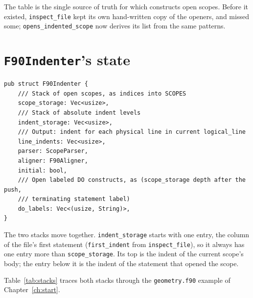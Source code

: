 \documentclass[11pt,a4paper,openany]{book}
\newcommand{\code}[1]{\texttt{\small #1}}
\newcommand{\file}[1]{\texttt{\small\color{accent}#1}}
\begin{document}
The table is the single source of truth for which constructs open scopes.
Before it existed, \code{inspect\_file} kept its own hand-written copy of the
openers, and missed some; \code{opens\_indented\_scope} now derives its list
from the same patterns.

\section{\texttt{F90Indenter}'s state}

\begin{lstlisting}[style=rust]
pub struct F90Indenter {
    /// Stack of open scopes, as indices into SCOPES
    scope_storage: Vec<usize>,
    /// Stack of absolute indent levels
    indent_storage: Vec<usize>,
    /// Output: indent for each physical line in current logical_line
    line_indents: Vec<usize>,
    parser: ScopeParser,
    aligner: F90Aligner,
    initial: bool,
    /// Open labeled DO constructs, as (scope_storage depth after the push,
    /// terminating statement label)
    do_labels: Vec<(usize, String)>,
}
\end{lstlisting}

The two stacks move together. \code{indent\_storage} starts with one entry,
the column of the file's first statement (\code{first\_indent} from
\code{inspect\_file}), so it always has one entry more than
\code{scope\_storage}. Its top is the indent of the current scope's body;
the entry below it is the indent of the statement that opened the scope.

Table~\ref{tab:stacks} traces both stacks through the \file{geometry.f90}
example of Chapter~\ref{ch:start}.
\end{document}
